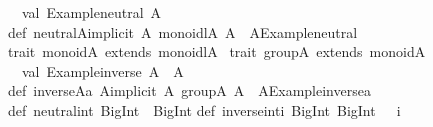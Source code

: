 \begin{isabellebody}
\begin{isamarkuptext}
\ \ val\ {}Example{}neutral{}{}\ A\isanewline
{}\isanewline
def\ neutral{}A{}{}implicit\ A{}\ monoidl{}A{}{}{}\ A\ {}\ A{}{}Example{}neutral{}\isanewline
\isanewline
trait\ monoid{}A{}\ extends\ monoidl{}A{}\ {}\isanewline
{}\isanewline
\isanewline
trait\ group{}A{}\ extends\ monoid{}A{}\ {}\isanewline
\ \ val\ {}Example{}inverse{}{}\ A\ {}{}\ A\isanewline
{}\isanewline
def\ inverse{}A{}{}a{}\ A{}{}implicit\ A{}\ group{}A{}{}{}\ A\ {}\ A{}{}Example{}inverse{}{}a{}\isanewline
\isanewline
def\ neutral{}int{}\ BigInt\ {}\ BigInt{}{}{}\isanewline
\isanewline
def\ inverse{}int{}i{}\ BigInt{}{}\ BigInt\ {}\ {}{}\ i{}\isanewline

\end{isamarkuptext}
\end{isabellebody}
